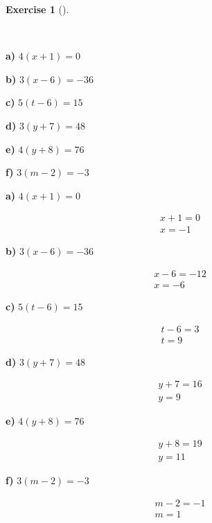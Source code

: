 \documentclass[
  letterpaper,
  DIV=11,
  numbers=noendperiod]{scrreprt}
\theoremstyle{definition}
\newtheorem{exercise}{Exercise}[chapter]
\theoremstyle{remark}
\begin{document}
\begin{exercise}[]\protect\hypertarget{exr-u5-6}{}\label{exr-u5-6}

~

\textbf{a)} \(\displaystyle 4(x + 1) = 0\)

\textbf{b)} \(\displaystyle 3(x - 6) = -36\)

\textbf{c)} \(\displaystyle 5(t - 6) = 15\)

\textbf{d)} \(\displaystyle 3(y + 7) = 48\)

\textbf{e)} \(\displaystyle 4(y + 8) = 76\)

\textbf{f)} \(\displaystyle 3(m - 2) = -3\)

\begin{tcolorbox}[enhanced jigsaw, opacitybacktitle=0.6, coltitle=black, arc=.35mm, colframe=quarto-callout-tip-color-frame, colback=white, bottomrule=.15mm, left=2mm, colbacktitle=quarto-callout-tip-color!10!white, titlerule=0mm, opacityback=0, title=\textcolor{quarto-callout-tip-color}{\faLightbulb}\hspace{0.5em}{🔍 View Solutions}, leftrule=.75mm, breakable, rightrule=.15mm, bottomtitle=1mm, toptitle=1mm, toprule=.15mm]

\textbf{a)} \(\displaystyle 4(x + 1) = 0\)

\begin{align*}
x + 1 = 0 \\ x = -1
\end{align*}

\textbf{b)} \(\displaystyle 3(x - 6) = -36\)

\begin{align*}
x - 6 = -12 \\ x = -6
\end{align*}

\textbf{c)} \(\displaystyle 5(t - 6) = 15\)

\begin{align*}
t - 6 = 3 \\ t = 9
\end{align*}

\textbf{d)} \(\displaystyle 3(y + 7) = 48\)

\begin{align*}
y + 7 = 16 \\ y = 9
\end{align*}

\textbf{e)} \(\displaystyle 4(y + 8) = 76\)

\begin{align*}
y + 8 = 19 \\ y = 11
\end{align*}

\textbf{f)} \(\displaystyle 3(m - 2) = -3\)

\begin{align*}
m - 2 = -1 \\ m = 1
\end{align*}

\end{tcolorbox}

\end{exercise}
\end{document}
